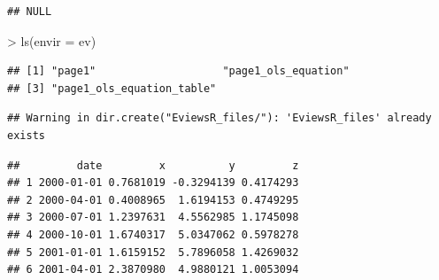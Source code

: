\documentclass[
]{article}
\newenvironment{Shaded}{\begin{snugshade}}{\end{snugshade}}
\newcommand{\AttributeTok}[1]{\textcolor[rgb]{0.77,0.63,0.00}{#1}}
\newcommand{\FunctionTok}[1]{\textcolor[rgb]{0.00,0.00,0.00}{#1}}
\newcommand{\NormalTok}[1]{#1}
\newcommand{\SpecialCharTok}[1]{\textcolor[rgb]{0.00,0.00,0.00}{#1}}
\begin{document}
\begin{Shaded}
\end{Shaded}

\begin{verbatim}
## NULL
\end{verbatim}

\begin{Shaded}
\begin{Highlighting}[]
\SpecialCharTok{\textgreater{}} \FunctionTok{ls}\NormalTok{(}\AttributeTok{envir =}\NormalTok{ ev)}
\end{Highlighting}
\end{Shaded}

\begin{verbatim}
## [1] "page1"                    "page1_ols_equation"      
## [3] "page1_ols_equation_table"
\end{verbatim}

\begin{verbatim}
## Warning in dir.create("EviewsR_files/"): 'EviewsR_files' already exists
\end{verbatim}

\begin{Shaded}
\end{Shaded}

\begin{verbatim}
##         date         x          y         z
## 1 2000-01-01 0.7681019 -0.3294139 0.4174293
## 2 2000-04-01 0.4008965  1.6194153 0.4749295
## 3 2000-07-01 1.2397631  4.5562985 1.1745098
## 4 2000-10-01 1.6740317  5.0347062 0.5978278
## 5 2001-01-01 1.6159152  5.7896058 1.4269032
## 6 2001-04-01 2.3870980  4.9880121 1.0053094
\end{verbatim}

\begin{Shaded}
\end{Shaded}
\end{document}
